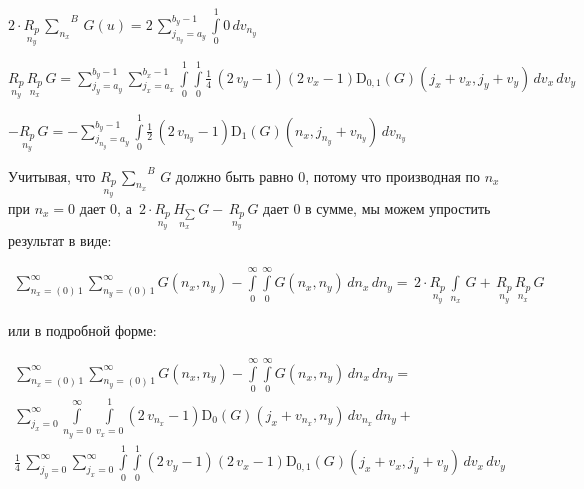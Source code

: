 \documentclass[11pt]{article}
\begin{document}
\(2\cdot\underset{n_y}{R_{p}}\,{\sum\limits_{n_x}^{}}^{B}\,G\left(u\right) = 2 \, {\sum\limits_{j_{n_{y}}=a_{y}}^{b_{y} - 1} \int\limits_{0}^{1} 0\,{d v_{n_{y}}}}\)

\(\underset{n_y}{R_{p}}\,\underset{n_x}{R_{p}}\,G = {\sum\limits_{j_{y}=a_{y}}^{b_{y} - 1} {\sum\limits_{j_{x}=a_{x}}^{b_{x} - 1} \int\limits_{0}^{1} \int\limits_{0}^{1} \frac{1}{4} \, {\left(2 \, v_{y} - 1\right)} {\left(2 \, v_{x} - 1\right)} \mathrm{D}_{0, 1}\left(G\right)\left(j_{x} + v_{x}, j_{y} + v_{y}\right)\,{d v_{x}}}\,{d v_{y}}}\)

\(-\underset{n_y}{R_{p}}\,G = -{\sum\limits_{j_{n_{y}}=a_{y}}^{b_{y} - 1} \int\limits_{0}^{1} \frac{1}{2} \, {\left(2 \, v_{n_{y}} - 1\right)} \mathrm{D}_{1}\left(G\right)\left(n_{x}, j_{n_{y}} + v_{n_{y}}\right)\,{d v_{n_{y}}}}\)

    Учитывая, что \(\underset{n_y}{R_{p}}\,{\sum\limits_{n_x}^{}}^{B}\,G\)
должно быть равно \(0\), потому что производная по \(n_x\) при
\(n_x = 0\) дает \(0\), а
\(\,2\cdot\underset{n_y}{R_{p}}\,\underset{n_x}{H_{\sum}}\,G -\,\underset{n_y}{ R_{p}}\,G\)
дает \(0\) в сумме, мы можем упростить результат в виде:

    \begin{equation}
\begin{array}{r}
\sum\limits_{n_x=\left(0\right)\,1}^{\infty}
\sum\limits_{n_y=\left(0\right)\,1}^{\infty}
G\left(n_x, n_y\right)
-
\int\limits_{0}^{\infty}
\int\limits_{0}^{\infty}
G\left(n_x, n_y\right)\,d{n_x}\,d{n_y} =
\,2\cdot\underset{n_y}{R_{p}}\,\int\limits_{n_x}^{}\,G 
+\,\underset{n_y}{R_{p}}\,\underset{n_x}{R_{p}}\,G
\end{array}
\end{equation}

    или в подробной форме:

\begin{equation}
\begin{array}{l}
\sum\limits_{n_x=\left(0\right)\,1}^{\infty}
\sum\limits_{n_y=\left(0\right)\,1}^{\infty}
G\left(n_x, n_y\right)
-
\int\limits_{0}^{\infty}
\int\limits_{0}^{\infty}
G\left(n_x, n_y\right)\,d{n_x}\,d{n_y} = \\
{\sum\limits_{j_{x}=0}^{\infty} \int\limits_{n_{y}=0}^{\infty} \int\limits_{v_x=0}^{1}  {\left(2 \, v_{n_{x}} - 1\right)} \mathrm{D}_{0}\left(G\right)\left(j_{x} + v_{n_{x}}, n_{y}\right)\,{d v_{n_{x}}}\,{d n_{y}}} + \\
\frac{1}{4} \, {\sum\limits_{j_{y}=0}^{\infty} {\sum\limits_{j_{x}=0}^{\infty} \int\limits_{0}^{1} \int\limits_{0}^{1} {\left(2 \, v_{y} - 1\right)} {\left(2 \, v_{x} - 1\right)} \mathrm{D}_{0, 1}\left(G\right)\left(j_{x} + v_{x}, j_{y} + v_{y}\right)\,{d v_{x}}}\,{d v_{y}}}
\end{array}
\end{equation}
\end{document}
